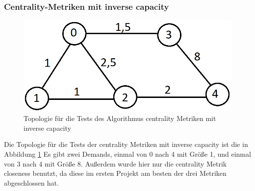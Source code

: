 \documentclass[sigconf, nonacm, review]{acmart}
\begin{document}
\subsubsection{Centrality-Metriken mit inverse capacity}
\begin{figure}
\centering
\includegraphics[width=\linewidth]{figures/kai_p2_baseTopo.png}
\caption{Topologie f\"ur die Tests des Algorithmus centrality Metriken mit inverse capacity}
\label{fig:kai_p2_baseTopo}
\end{figure}
Die Topologie f\"ur die Tests der centrality Metriken mit inverse capacity ist die in Abbildung \ref{fig:kai_p2_baseTopo}
Es gibt zwei Demands, einmal von 0 nach 4 mit Gr\"o\ss e 1, und einmal von 3 nach 4 mit Gr\"o\ss e 8.
Au\ss erdem wurde hier nur die centrality Metrik closeness benutzt, da diese im ersten Projekt am besten der drei Metriken abgeschlossen hat.
\end{document}
